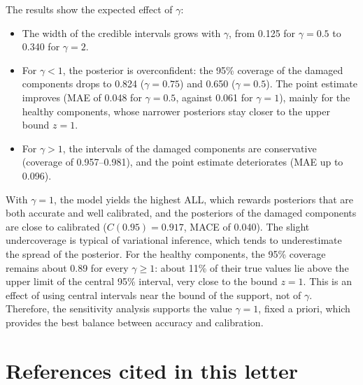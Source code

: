 \documentclass[11pt]{article}
\begin{document}
The results show the expected effect of $\gamma$:
\begin{itemize}[leftmargin=*]
	\item The width of the credible intervals grows with $\gamma$, from 0.125 for $\gamma=0.5$ to 0.340 for $\gamma=2$.
	\item For $\gamma<1$, the posterior is overconfident: the 95\% coverage of the damaged components drops to 0.824 ($\gamma=0.75$) and 0.650 ($\gamma=0.5$). The point estimate improves (MAE of 0.048 for $\gamma=0.5$, against 0.061 for $\gamma=1$), mainly for the healthy components, whose narrower posteriors stay closer to the upper bound $z=1$.
	\item For $\gamma>1$, the intervals of the damaged components are conservative (coverage of 0.957--0.981), and the point estimate deteriorates (MAE up to 0.096).
\end{itemize}
With $\gamma=1$, the model yields the highest ALL, which rewards posteriors that are both accurate and well calibrated, and the posteriors of the damaged components are close to calibrated ($C(0.95)=0.917$, MACE of 0.040).
The slight undercoverage is typical of variational inference, which tends to underestimate the spread of the posterior.
For the healthy components, the 95\% coverage remains about 0.89 for every $\gamma\geq1$: about 11\% of their true values lie above the upper limit of the central 95\% interval, very close to the bound $z=1$.
This is an effect of using central intervals near the bound of the support, not of $\gamma$.
Therefore, the sensitivity analysis supports the value $\gamma=1$, fixed a priori, which provides the best balance between accuracy and calibration.

\section{References cited in this letter}
{\small
\renewcommand{\bibsection}{}
\setlength{\bibsep}{0.3ex}


}
\end{document}
